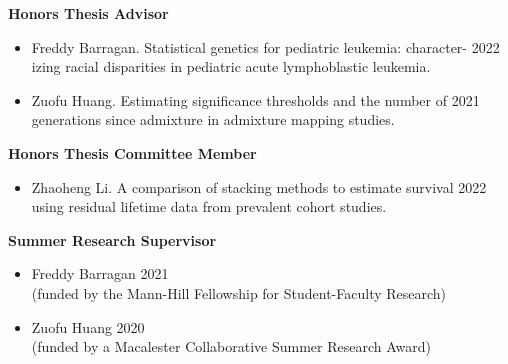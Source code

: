 \documentclass[margin]{res}
\begin{document}
\begin{resume}
\textbf{Honors Thesis Advisor}
\begin{itemize}
\item Freddy Barragan. Statistical genetics for pediatric leukemia: character- \hfill 2022 \\ izing racial disparities in pediatric acute lymphoblastic leukemia.
\item Zuofu Huang. Estimating significance thresholds and the number of \hfill 2021 \\generations since admixture in admixture mapping studies. \\
\end{itemize}

\textbf{Honors Thesis Committee Member}
\begin{itemize}
\item Zhaoheng Li. A comparison of stacking methods to estimate survival  \hfill 2022 \\ using residual lifetime data from prevalent cohort studies.  \\
\end{itemize}


\textbf{Summer Research Supervisor}
\begin{itemize}
\item Freddy Barragan \hfill 2021 \\ (funded by the Mann-Hill Fellowship for Student-Faculty Research) 
\item Zuofu Huang \hfill 2020 \\ (funded by a Macalester Collaborative Summer Research Award) \\
\end{itemize}








	
		


\end{resume}
\end{document}
